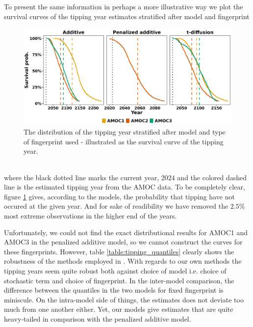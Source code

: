 To present the same information in perhaps a more illustrative way we plot the survival curves of the tipping year estimates stratified after model and fingerprint
\begin{figure}[h!]
    \begin{center}
        \includegraphics[scale = .096]{figures/surival_curve_first97.5.jpeg}
        \caption{The distribution of the tipping year stratified after model and type of fingerprint used - illustrated as the survival curve of the tipping year.}
        \label{figure:surival_curve_taus}
    \end{center}
\end{figure}\\
where the black dotted line marks the current year, $2024$ and the colored dashed line is the estimated tipping year from the AMOC data. To be completely clear, figure \ref{figure:surival_curve_taus} gives, according to the models, the probability that tipping have not occured at the given year. And for sake of readibility we have removed the $2.5\%$ most extreme observations in the higher end of the years.

Unfortunately, we could not find the exact distributional results for AMOC1 and AMOC3 in the penalized additive model, so we cannot construct the curves for these fingerprints. However, table \ref{table:tipping_quantiles} clearly shows the robustness of the methods employed in \cite{Ditlevsen2023}. With regards to our own methods the tipping years seem quite robust both against choice of model i.e. choice of stochastic term and choice of fingerprint. In the inter-model comparison, the difference between the quantiles in the two models for fixed fingerprint is miniscule. On the intra-model side of things, the estimates does not deviate too much from one another either. Yet, our models give estimates that are quite heavy-tailed in comparison with the penalized additive model.

